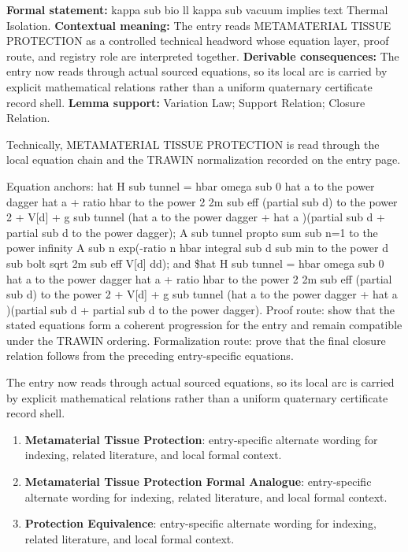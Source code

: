 \begingroup\footnotesize\setlength{\emergencystretch}{3em}\sloppy
\textbf{Formal statement:} kappa sub bio ll kappa sub vacuum implies text Thermal Isolation. \textbf{Contextual meaning:} The entry reads METAMATERIAL TISSUE PROTECTION as a controlled technical headword whose equation layer, proof route, and registry role are interpreted together. \textbf{Derivable consequences:} The entry now reads through actual sourced equations, so its local arc is carried by explicit mathematical relations rather than a uniform quaternary certificate record shell. \textbf{Lemma support:} Variation Law; Support Relation; Closure Relation.\par
\endgroup

Technically, METAMATERIAL TISSUE PROTECTION is read through the local equation chain and the TRAWIN normalization recorded on the entry page.

Equation anchors: hat H sub tunnel = hbar omega sub 0 hat a to the power dagger hat a + ratio hbar to the power 2 2m sub eff (partial sub d) to the power 2 + V[d] + g sub tunnel (hat a to the power dagger + hat a )(partial sub d + partial sub d to the power dagger); A sub tunnel propto sum sub n=1 to the power infinity A sub n exp(-ratio n hbar integral sub d sub min to the power d sub bolt sqrt 2m sub eff V[d] dd); and \$hat H sub tunnel = hbar omega sub 0 hat a to the power dagger hat a + ratio hbar to the power 2 2m sub eff (partial sub d) to the power 2 + V[d] + g sub tunnel (hat a to the power dagger + hat a )(partial sub d + partial sub d to the power dagger). Proof route: show that the stated equations form a coherent progression for the entry and remain compatible under the TRAWIN ordering. Formalization route: prove that the final closure relation follows from the preceding entry-specific equations.

The entry now reads through actual sourced equations, so its local arc is carried by explicit mathematical relations rather than a uniform quaternary certificate record shell.
\endgroup

\begin{enumerate}[leftmargin=1.6em,itemsep=6pt,topsep=4pt]
\item \textbf{Metamaterial Tissue Protection}: entry-specific alternate wording for indexing, related literature, and local formal context.
\item \textbf{Metamaterial Tissue Protection Formal Analogue}: entry-specific alternate wording for indexing, related literature, and local formal context.
\item \textbf{Protection Equivalence}: entry-specific alternate wording for indexing, related literature, and local formal context.
\end{enumerate}


